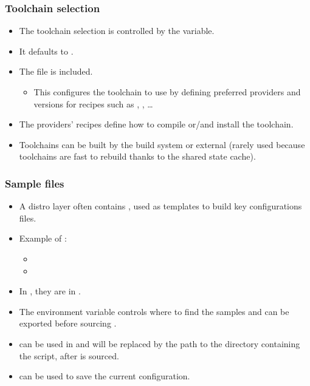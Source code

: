 \begin{frame}
  \frametitle{Toolchain selection}
  \begin{itemize}
    \item The toolchain selection is controlled by the 
      variable.
    \item It defaults to .
    \item The  file is
      included.
    \begin{itemize}
      \item This configures the toolchain to use by defining preferred
        providers and versions for recipes such as ,
        , \dots
    \end{itemize}
    \item The providers' recipes define how to compile or/and install
      the toolchain.
    \item Toolchains can be built by the build system or external
      (rarely used because toolchains are fast to rebuild thanks
       to the shared state cache).
  \end{itemize}
\end{frame}

\begin{frame}
  \frametitle{Sample files}
  \begin{itemize}
    \item A distro layer often contains , used as
      templates to build key configurations files.
    \item Example of :
      \begin{itemize}
        \item {}
        \item {}
      \end{itemize}
    \item In , they are in .
    \item The  environment variable controls where to
      find the samples and can be exported before sourcing
      .
    \item {} can be used in  and will
      be replaced by the path to the directory containing the
       script, after  is
      sourced.
    \item {} can be used to save the current
      configuration.
  \end{itemize}
\end{frame}

